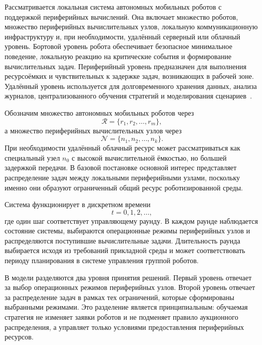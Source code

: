 Рассматривается локальная система автономных мобильных роботов с поддержкой периферийных вычислений. Она включает множество роботов, множество периферийных вычислительных узлов, локальную коммуникационную инфраструктуру и, при необходимости, удалённый серверный или облачный уровень. Бортовой уровень робота обеспечивает безопасное минимальное поведение, локальную реакцию на критические события и формирование вычислительных задач. Периферийный уровень предназначен для выполнения ресурсоёмких и чувствительных к задержке задач, возникающих в рабочей зоне. Удалённый уровень используется для долговременного хранения данных, анализа журналов, централизованного обучения стратегий и моделирования сценариев~\cite{Shi2016Edge,Satyanarayanan2017Emergence,Tahir2025EdgeRoboticsSurvey}.

Обозначим множество автономных мобильных роботов через
\begin{equation}
    \mathcal{R}=\{r_1,r_2,\ldots,r_m\},
\end{equation}
а множество периферийных вычислительных узлов через
\begin{equation}
    \mathcal{N}=\{n_1,n_2,\ldots,n_k\}.
\end{equation}
При необходимости удалённый облачный ресурс может рассматриваться как специальный узел $n_0$ с высокой вычислительной ёмкостью, но большей задержкой передачи. В базовой постановке основной интерес представляет распределение задач между локальными периферийными узлами, поскольку именно они образуют ограниченный общий ресурс роботизированной среды.

Система функционирует в дискретном времени
\begin{equation}
    t=0,1,2,\ldots,
\end{equation}
где один шаг соответствует управляющему раунду. В каждом раунде наблюдается состояние системы, выбираются операционные режимы периферийных узлов и распределяются поступившие вычислительные задачи. Длительность раунда выбирается исходя из требований прикладной среды и может соответствовать периоду планирования в системе управления группой роботов.

В модели разделяются два уровня принятия решений. Первый уровень отвечает за выбор операционных режимов периферийных узлов. Второй уровень отвечает за распределение задач в рамках тех ограничений, которые сформированы выбранными режимами. Это разделение является принципиальным: обучаемая стратегия не изменяет заявки роботов и не подменяет правило аукционного распределения, а управляет только условиями предоставления периферийных ресурсов.

